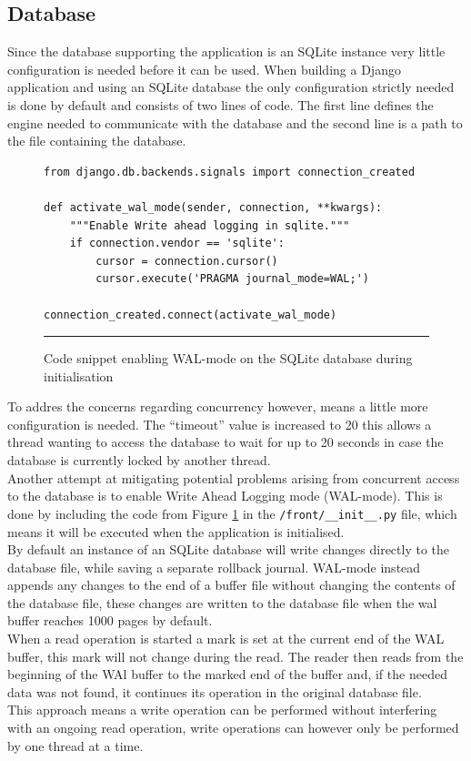 \subsection{Database}
Since the database supporting the application is an SQLite instance very little configuration is needed before it can be used. When building a Django application and using an SQLite database the only configuration strictly needed is done by default and consists of two lines of code. The first line defines the engine needed to communicate with the database and the second line is a path to the file containing the database.
\\
\begin{figure}[t]
\centering
\begin{verbatim}
from django.db.backends.signals import connection_created

def activate_wal_mode(sender, connection, **kwargs):
    """Enable Write ahead logging in sqlite."""
    if connection.vendor == 'sqlite':
        cursor = connection.cursor()
        cursor.execute('PRAGMA journal_mode=WAL;')

connection_created.connect(activate_wal_mode)
\end{verbatim}
\caption{Code snippet enabling WAL-mode on the SQLite database during initialisation}
\label{des:code_wal}
\hrule 
\end{figure}
To addres the concerns regarding concurrency however, means a little more configuration is needed. The ``timeout'' value is increased to 20 this allows a thread wanting to access the database to wait for up to 20 seconds in case the database is currently locked by another thread.
\\
Another attempt at mitigating potential problems arising from concurrent access to the database is to enable Write Ahead Logging mode (WAL-mode). This is done by including the code from Figure \ref{des:code_wal} in the \verb|/front/__init__.py| file, which means it will be executed when the application is initialised.\\
By default an instance of an SQLite database will write changes directly to the database file, while saving a separate rollback journal. WAL-mode instead appends any changes to the end of a buffer file without changing the contents of the database file, these changes are written to the database file when the wal buffer reaches 1000 pages by default.\\
When a read operation is started a mark is set at the current end of the WAL buffer, this mark will not change during the read. The reader then reads from the beginning of the WAl buffer to the marked end of the buffer and, if the needed data was not found, it continues its operation in the original database file.\\
This approach means a write operation can be performed without interfering with an ongoing read operation, write operations can however only be performed by one thread at a time.

